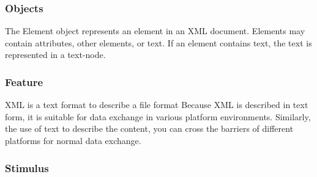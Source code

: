 \subsubsection{Objects}

The Element object represents an element in an XML document.
Elements may contain attributes, other elements, or text.
If an element contains text, the text is represented in a text-node.

\subsubsection{Feature}

XML is a text format to describe a file format
Because XML is described in text form, it is suitable for data exchange in various platform environments.
Similarly, the use of text to describe the content, you can cross the barriers of different platforms for normal data exchange.

\subsubsection{Stimulus}

